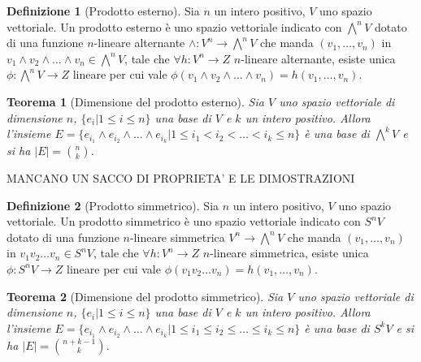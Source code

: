 \documentclass[11pt]{article}
\theoremstyle{plain}
\newtheorem{thm}{Teorema}[section]
\theoremstyle{definition}
\newtheorem{defn}{Definizione}[section]
\theoremstyle{remark}
\begin{document}
\begin{defn}[Prodotto esterno]
Sia $n$ un intero positivo, $V$ uno spazio vettoriale. Un prodotto esterno è uno spazio vettoriale indicato con $\bigwedge^n V$
dotato di una funzione $n$-lineare alternante $\wedge: V^n \to \bigwedge^n V$ che manda $(v_1,\ldots,v_n)$ in 
$v_1\wedge v_2\wedge\ldots\wedge v_n \in \bigwedge^n V$, tale che $\forall h: V^n \to Z$ $n$-lineare alternante, 
esiste unica $\phi: \bigwedge^n V \to Z $ lineare per cui vale $\phi(v_1\wedge v_2\wedge \ldots \wedge v_n)=h(v_1,\ldots,v_n)$.

\label{defn:prodotto esterno}
\end{defn}





\begin{thm}[Dimensione del prodotto esterno]
Sia $V$ uno spazio vettoriale di dimensione $n$, $\{e_i| 1 \leq i \leq n\}$ una base di $V$ e $k$ un intero positivo.
Allora l'insieme $E=\{e_{i_1} \wedge e_{i_2}\wedge \ldots \wedge e_{i_k}| 1 \leq i_1 < i_2 <\ldots< i_k \leq n\}$ è una base di $\bigwedge^k V$ 
e si ha $|E|= \binom {n}{k}$.

\label{thm:prodotto esterno}
\end{thm}


MANCANO UN SACCO DI PROPRIETA' E LE DIMOSTRAZIONI





\begin{defn}[Prodotto simmetrico]

Sia $n$ un intero positivo, $V$ uno spazio vettoriale. Un prodotto simmetrico è uno spazio vettoriale indicato con $S^n V$
dotato di una funzione $n$-lineare simmetrica $V^n \to \bigwedge^n V$ che manda $(v_1,\ldots,v_n)$ in 
$v_1 v_2\ldots v_n \in S^n V$, tale che $\forall h: V^n \to Z$ $n$-lineare simmetrica, 
esiste unica $\phi: S^n V \to Z $ lineare per cui vale $\phi(v_1 v_2 \ldots v_n)=h(v_1,\ldots,v_n)$.

\label{defn:prodotto simmetrico}
\end{defn}





\begin{thm}[Dimensione del prodotto simmetrico]

Sia $V$ uno spazio vettoriale di dimensione $n$, $\{e_i| 1 \leq i \leq n\}$ una base di $V$ e $k$ un intero positivo.
Allora l'insieme $E=\{e_{i_1} \wedge e_{i_2}\wedge\ldots \wedge e_{i_k}| 1 \leq i_1 \leq i_2 \leq\ldots\leq i_k \leq n\}$ è una base di $S^k V$ 
e si ha $|E|= \binom {n+k-1}{k}$.

\label{thm:prodotto simmetrico}
\end{thm}
\end{document}
